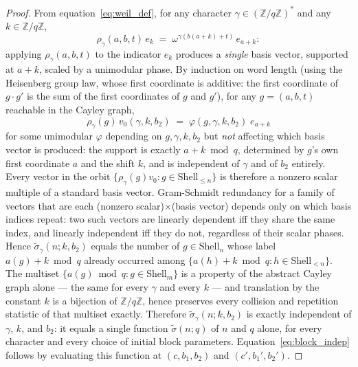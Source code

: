 \documentclass[11pt,a4paper]{article}
\theoremstyle{definition}
\newcommand{\ZqZ}{\mathbb{Z}/q\mathbb{Z}}
\newcommand{\Fq}{(\mathbb{Z}/q\mathbb{Z})^*}
\begin{document}
    \begin{proof}
      From equation~\eqref{eq:weil_def}, for any character $\gamma\in\Fq$
      and any $k\in\ZqZ$,
      \[
        \rho_\gamma(a,b,t)\,e_k \;=\; \omega^{\gamma(b(a+k)+t)}\,e_{a+k}:
      \]
      applying $\rho_\gamma(a,b,t)$ to the indicator $e_k$ produces a
      \emph{single} basis vector, supported at $a+k$, scaled by a
      unimodular phase.
      By induction on word length (using the Heisenberg group law, whose
      first coordinate is additive: the first coordinate of $g\cdot g'$ is
      the sum of the first coordinates of $g$ and $g'$), for any
      $g=(a,b,t)$ reachable in the Cayley graph,
      \[
        \rho_\gamma(g)\,v_0(\gamma,k,b_2)
        \;=\; \varphi(g,\gamma,k,b_2)\;e_{a+k}
      \]
      for some unimodular $\varphi$ depending on $g,\gamma,k,b_2$ but
      \emph{not} affecting which basis vector is produced: the support is
      exactly $a+k \bmod q$, determined by $g$'s own first coordinate $a$
      and the shift $k$, and is independent of $\gamma$ and of $b_2$
      entirely.
      Every vector in the orbit $\{\rho_\gamma(g)v_0 : g\in\mathrm{Shell}_{\leq n}\}$
      is therefore a nonzero scalar multiple of a standard basis vector.
      Gram-Schmidt redundancy for a family of vectors that are each
      (nonzero scalar)$\times$(basis vector) depends only on which basis
      indices repeat: two such vectors are linearly dependent iff they
      share the same index, and linearly independent iff they do not,
      regardless of their scalar phases.
      Hence $\tilde\sigma_\gamma(n;k,b_2)$ equals the number of
      $g\in\mathrm{Shell}_n$ whose label $a(g)+k \bmod q$ already occurred
      among $\{a(h)+k \bmod q : h\in\mathrm{Shell}_{<n}\}$.
      The multiset $\{a(g) \bmod q : g\in\mathrm{Shell}_m\}$ is a property
      of the abstract Cayley graph alone --- the same for every $\gamma$
      and every $k$ --- and translation by the constant $k$ is a bijection
      of $\ZqZ$, hence preserves every collision and repetition statistic
      of that multiset exactly.
      Therefore $\tilde\sigma_\gamma(n;k,b_2)$ is exactly independent of
      $\gamma$, $k$, and $b_2$: it equals a single function
      $\tilde\sigma(n;q)$ of $n$ and $q$ alone, for every character and
      every choice of initial block parameters.
      Equation~\eqref{eq:block_indep} follows by evaluating this function
      at $(c,b_1,b_2)$ and $(c',b_1',b_2')$.
    \end{proof}
\end{document}
